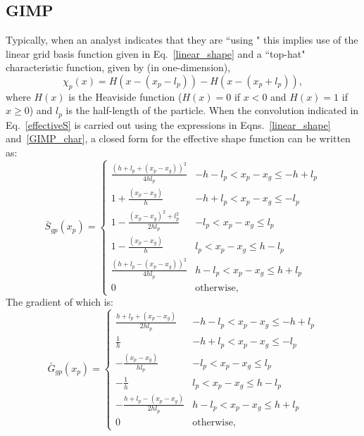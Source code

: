 \subsection{GIMP}
Typically, when an analyst indicates that
they are ``using \GIMP" this implies use of the linear grid basis function
given in Eq.~\ref{linear_shape} and a ``top-hat" characteristic function,
given by (in one-dimension),
\begin{equation} \label{GIMP_char}
\chi_p(x) = H(x-(x_p-l_p))-H(x-(x_p+l_p)) ,
\end{equation}
where $H(x)$ is the Heaviside function
($H(x)=0$ if $x<0$ and $H(x)=1$ if $x\ge0$) and $l_p$ is the half-length
of the particle.  When the convolution indicated in Eq.~\ref{effectiveS}
is carried out using the expressions in Eqns.~\ref{linear_shape}
 and~\ref{GIMP_char}, a closed form for the effective shape function can be
written as:
\begin{equation} \label{gimp_shape}
\bar{S}_{gp}\left(x_p\right) = \begin{cases}
   \frac{\left(h+l_p+\left(x_p-x_g\right)\right)^2}{4hl_p} & {-h -l_p < x_p-x_g \le -h+l_p} \\
   1 + \frac{\left(x_p-x_g\right)}{h} & {-h + l_p < x_p-x_g \le -l_p} \\
   1 - \frac{\left(x_p-x_g\right)^2 + l_p^2}{2hl_p} & {-l_p < x_p-x_g \le l_p} \\
   1 - \frac{\left(x_p-x_g\right)}{h} & {l_p  < x_p-x_g \le h-l_p} \\
   \frac{\left(h+l_p-\left(x_p-x_g\right)\right)^2}{4hl_p} & {h -l_p < x_p-x_g \le h+l_p} \\
   0 & \text{otherwise},
\end{cases}
\end{equation}
The gradient of which is:
\begin{equation} \label{gimpGrad}
\bar{G}_{gp}(x_p) = \begin{cases}
   \frac{h+l_p+\left(x_p-x_g\right)}{2 h l_p} & {-h -l_p < x_p-x_g \le -h+l_p} \\
   \frac{1}{h} & {-h + l_p < x_p-x_g \le -l_p} \\
   - \frac{\left(x_p-x_g\right)}{h l_p} & {-l_p < x_p-x_g \le l_p} \\
   - \frac{1}{h} & {l_p  < x_p-x_g \le h-l_p} \\
   - \frac{h+l_p-\left(x_p-x_g\right)}{2 h l_p} & {h -l_p < x_p-x_g \le h+l_p} \\
   0 & \text{otherwise},
\end{cases}
\end{equation}
